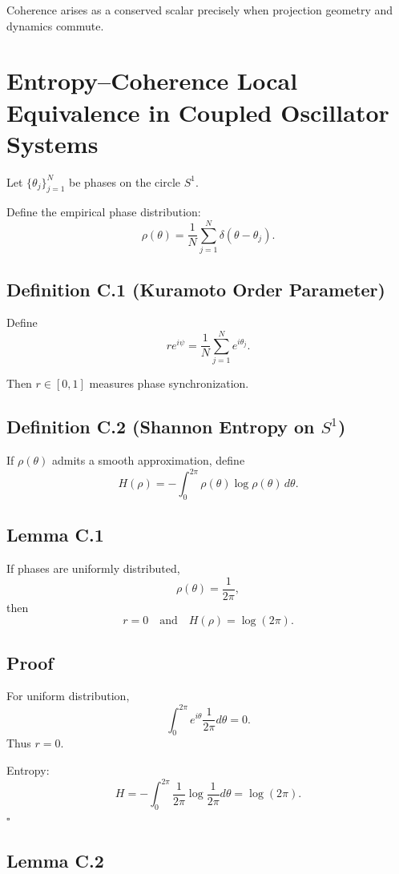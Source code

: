 \documentclass[12pt]{article}
\begin{document}
Coherence arises as a conserved scalar precisely when projection geometry and dynamics commute.

\section{Entropy--Coherence Local Equivalence in Coupled Oscillator Systems}

Let $\{\theta_j\}_{j=1}^N$ be phases on the circle $S^1$.

Define the empirical phase distribution:
\[
\rho(\theta) = \frac{1}{N} \sum_{j=1}^N \delta(\theta - \theta_j).
\]

\subsection*{Definition C.1 (Kuramoto Order Parameter)}

Define
\[
r e^{i\psi}
=
\frac{1}{N}
\sum_{j=1}^N e^{i\theta_j}.
\]

Then $r \in [0,1]$ measures phase synchronization.

\subsection*{Definition C.2 (Shannon Entropy on $S^1$)}

If $\rho(\theta)$ admits a smooth approximation, define
\[
H(\rho)
=
- \int_{0}^{2\pi}
\rho(\theta) \log \rho(\theta)\, d\theta.
\]

\subsection*{Lemma C.1}

If phases are uniformly distributed,
\[
\rho(\theta) = \frac{1}{2\pi},
\]
then
\[
r = 0
\quad \text{and} \quad
H(\rho) = \log(2\pi).
\]

\subsection*{Proof}

For uniform distribution,
\[
\int_0^{2\pi} e^{i\theta} \frac{1}{2\pi} d\theta = 0.
\]
Thus $r = 0$.

Entropy:
\[
H = -\int_0^{2\pi} \frac{1}{2\pi} \log\frac{1}{2\pi} d\theta
= \log(2\pi).
\]
\hfill $\square$

\subsection*{Lemma C.2}
\end{document}
